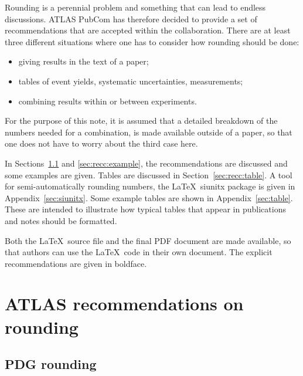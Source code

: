 \documentclass[UKenglish]{latex/atlasdoc}
\begin{document}
Rounding is a perennial problem and something that can lead to endless
discussions. ATLAS PubCom has therefore decided to provide
a set of recommendations that are accepted within the
collaboration. There are at least three different situations where one
has to consider how rounding should be done:
\begin{itemize}
\item giving results in the text of a paper;
\item tables of event yields, systematic uncertainties, measurements;
\item combining results within or between experiments.
\end{itemize}
For the purpose of this note, it is assumed that a detailed breakdown of
the numbers needed for a combination, is made available
outside of a paper, so that one does not have to worry about the third
case here.

In Sections~\ref{sec:pdg-rounding} and \ref{sec:recc:example},
the recommendations are discussed and some examples are given. Tables are
discussed in Section~\ref{sec:recc:table}.
A tool for semi-automatically rounding numbers, the
\LaTeX\ \textsf{siunitx} package is given in Appendix~\ref{sec:siunitx}. Some
example tables are shown in Appendix~\ref{sec:table}. These are intended to illustrate how typical
tables that appear in publications and notes should be formatted.

Both the \LaTeX\ source file and the final PDF document are
made available, so that authors can use the \LaTeX\ code in
their own document. The explicit recommendations are given in boldface.


\section{ATLAS recommendations on rounding}
\label{sec:recc}

\subsection{PDG rounding}
\label{sec:pdg-rounding}
\end{document}
